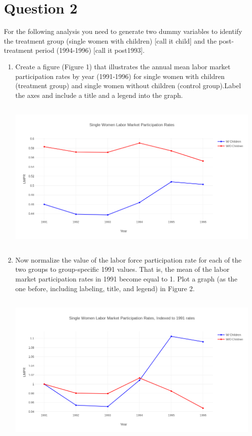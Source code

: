 \documentclass{article}
\begin{document}
\section{Question 2}

For the following analysis you need to generate two dummy variables to identify the treatment group (single women with children) [call it child] and the post-treatment period (1994-1996) [call it post1993].

\begin{enumerate}[label=\alph*]
\item  Create a figure (Figure 1) that illustrates the annual mean labor market participation rates by year (1991-1996) for single women with children (treatment group) and single women without children (control group).Label the axes and include a title and a legend into the graph.

\includegraphics[width=5in, height=3in]{newplot}

\item Now normalize the value of the labor force participation rate for each of the two groups to group-specific 1991 values. That is, the mean of the labor  market participation rates in 1991 become equal to 1. Plot a graph (as the one before, including labeling, title, and legend) in Figure 2.

\includegraphics[width=5in, height=3in]{figure2}


\end{enumerate}
\end{document}
